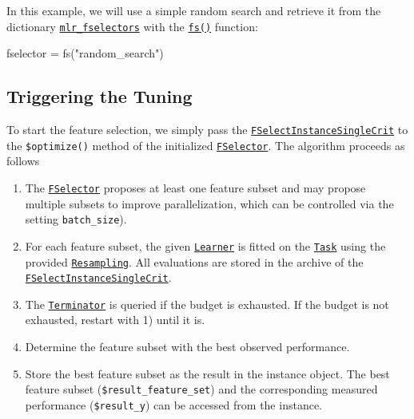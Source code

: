 \documentclass[
]{scrbook}
\newenvironment{Shaded}{\begin{snugshade}}{\end{snugshade}}
\newcommand{\FunctionTok}[1]{\textcolor[rgb]{0.00,0.00,0.00}{#1}}
\newcommand{\NormalTok}[1]{#1}
\newcommand{\OtherTok}[1]{\textcolor[rgb]{0.56,0.35,0.01}{#1}}
\newcommand{\StringTok}[1]{\textcolor[rgb]{0.31,0.60,0.02}{#1}}
\providecommand{\tightlist}{%
  \setlength{\itemsep}{0pt}\setlength{\parskip}{0pt}}
\renewenvironment{Shaded} {\begin{snugshade}\small} {\end{snugshade}}
\begin{document}
In this example, we will use a simple random search and retrieve it from the dictionary \href{https://mlr3fselect.mlr-org.com/reference/mlr_fselectors.html}{\texttt{mlr\_fselectors}} with the \href{https://mlr3fselect.mlr-org.com/reference/fs.html}{\texttt{fs()}} function:

\begin{Shaded}
\begin{Highlighting}[]
\NormalTok{fselector }\OtherTok{=} \FunctionTok{fs}\NormalTok{(}\StringTok{"random\_search"}\NormalTok{)}
\end{Highlighting}
\end{Shaded}

\hypertarget{wrapper-selection-triggering}{%
\subsection{Triggering the Tuning}\label{wrapper-selection-triggering}}

To start the feature selection, we simply pass the \href{https://mlr3fselect.mlr-org.com/reference/FSelectInstanceSingleCrit.html}{\texttt{FSelectInstanceSingleCrit}} to the \texttt{\$optimize()} method of the initialized \href{https://mlr3fselect.mlr-org.com/reference/FSelector.html}{\texttt{FSelector}}. The algorithm proceeds as follows

\begin{enumerate}
\def\labelenumi{\arabic{enumi}.}
\tightlist
\item
  The \href{https://mlr3fselect.mlr-org.com/reference/FSelector.html}{\texttt{FSelector}} proposes at least one feature subset and may propose multiple subsets to improve parallelization, which can be controlled via the setting \texttt{batch\_size}).
\item
  For each feature subset, the given \href{https://mlr3.mlr-org.com/reference/Learner.html}{\texttt{Learner}} is fitted on the \href{https://mlr3.mlr-org.com/reference/Task.html}{\texttt{Task}} using the provided \href{https://mlr3.mlr-org.com/reference/Resampling.html}{\texttt{Resampling}}.
  All evaluations are stored in the archive of the \href{https://mlr3fselect.mlr-org.com/reference/FSelectInstanceSingleCrit.html}{\texttt{FSelectInstanceSingleCrit}}.
\item
  The \href{https://bbotk.mlr-org.com/reference/Terminator.html}{\texttt{Terminator}} is queried if the budget is exhausted.
  If the budget is not exhausted, restart with 1) until it is.
\item
  Determine the feature subset with the best observed performance.
\item
  Store the best feature subset as the result in the instance object.
  The best feature subset (\texttt{\$result\_feature\_set}) and the corresponding measured performance (\texttt{\$result\_y}) can be accessed from the instance.
\end{enumerate}
\end{document}

